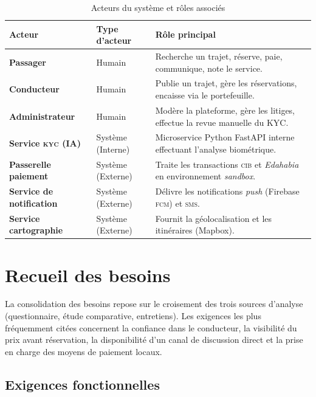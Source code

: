 \begin{table}[H]
\centering
\small
\renewcommand{\arraystretch}{1.15}
\begin{tabularx}{\textwidth}{|l|l|X|}
\hline
\rowcolor{rohlight}
\textbf{Acteur} & \textbf{Type d'acteur} & \textbf{Rôle principal} \\
\hline
\textbf{Passager} & Humain & Recherche un trajet, réserve, paie, communique, note le service. \\
\hline
\textbf{Conducteur} & Humain & Publie un trajet, gère les réservations, encaisse via le portefeuille. \\
\hline
\textbf{Administrateur} & Humain & Modère la plateforme, gère les litiges, effectue la revue manuelle du KYC. \\
\hline
\textbf{Service \textsc{kyc} (IA)} & Système (Interne) & Microservice Python FastAPI interne effectuant l'analyse biométrique. \\
\hline
\textbf{Passerelle paiement} & Système (Externe) & Traite les transactions \textsc{cib} et \textit{Edahabia} en environnement \textit{sandbox}. \\
\hline
\textbf{Service de notification}& Système (Externe) & Délivre les notifications \textit{push} (Firebase \textsc{fcm}) et \textsc{sms}. \\
\hline
\textbf{Service cartographie} & Système (Externe) & Fournit la géolocalisation et les itinéraires (Mapbox). \\
\hline
\end{tabularx}
  \caption{Acteurs du système et rôles associés}
  \label{tab:acteurs}
\end{table}

\section{Recueil des besoins}
\label{sec:recueil-besoins}

La consolidation des besoins repose sur le croisement des trois sources d'analyse (questionnaire, étude comparative, entretiens). Les exigences les plus fréquemment citées concernent la confiance dans le conducteur, la visibilité du prix avant réservation, la disponibilité d'un canal de discussion direct et la prise en charge des moyens de paiement locaux.

\subsection{Exigences fonctionnelles}
\label{sec:exigences-fonc}


